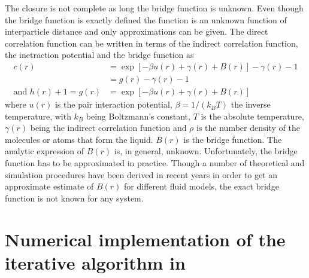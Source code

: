  The closure is not complete as long the bridge function is
unknown. Even though the bridge function is exactly defined the
function is an unknown function of interparticle distance and only
approximations can be given. The direct correlation function can be
written in terms of the indirect correlation function, the
inetraction potential and the bridge function as
\begin{align}\label{eq:ozclosure}
c(r)&= \exp\left[ -\beta u(r) +\gamma(r)+B(r)\right] - \gamma(r)-1 \\
    &= g(r)- \gamma(r)-1 \nonumber \\
\mbox{and } h(r)+1=g(r)&= \exp\left[ -\beta u(r)
+\gamma(r)+B(r)\right] \label{eq:ozg(r)}
\end{align}
where $u(r)$ is the pair interaction potential, $\beta=1/(k_B T)$
the inverse temperature, with $k_B$ being Boltzmann’s constant, $T$
is the absolute temperature, $\gamma(r)$ being the indirect
correlation function and $\rho$ is the number density of the
molecules or atoms that form the liquid. $B(r)$ is the bridge
function. The analytic expression of $B(r)$ is, in general, unknown.
Unfortunately, the bridge function has to be approximated in
practice. Though a number of theoretical and simulation procedures
have been derived in recent years in order to get an approximate
estimate of $B(r)$ for different fluid models, the exact bridge
function is not known for any system.

\section{Numerical implementation of the iterative algorithm in \SASfit}

